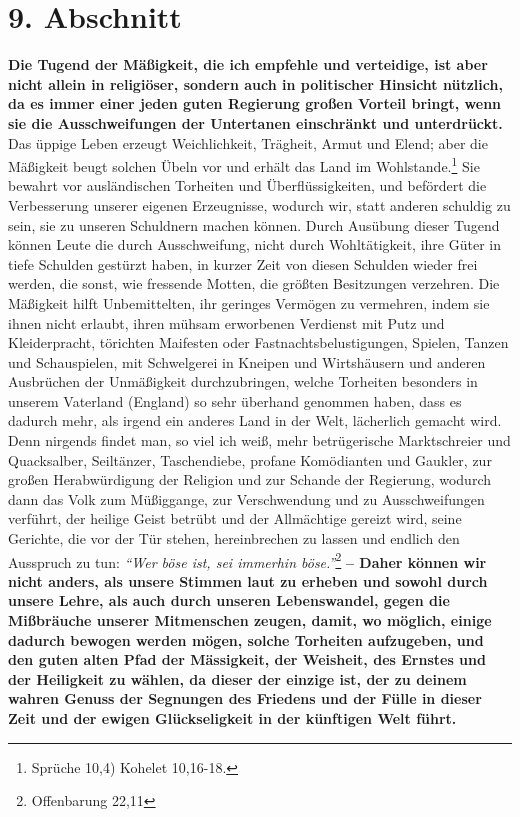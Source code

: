 \section{9. Abschnitt} \label{kap18_ab9}

\label{ref:18_09_gesellschaftlich} \textbf{Die Tugend der Mäßigkeit, die ich
empfehle und verteidige, ist aber nicht
allein in religiöser, sondern auch in politischer Hinsicht
nützlich, da es immer
einer jeden guten Regierung großen Vorteil bringt, wenn sie die
Ausschweifungen der Untertanen einschränkt und unterdrückt.} Das üppige Leben
erzeugt Weichlichkeit, Trägheit, Armut und Elend;
aber die Mäßigkeit beugt
solchen Übeln vor und erhält das Land im Wohlstande.\footnote{Sprüche 10,4)
Kohelet 10,16-18.}
Sie bewahrt vor ausländischen Torheiten und
Überflüssigkeiten, und befördert die Verbesserung unserer eigenen Erzeugnisse,
wodurch wir, statt anderen schuldig zu sein, sie zu unseren Schuldnern machen
können. Durch Ausübung dieser Tugend können Leute die durch Ausschweifung, nicht
durch Wohltätigkeit, ihre Güter in tiefe Schulden gestürzt haben, in kurzer
Zeit von diesen Schulden wieder frei werden, die sonst, wie fressende Motten,
die größten Besitzungen verzehren. Die Mäßigkeit hilft Unbemittelten, ihr
geringes Vermögen zu vermehren, indem sie ihnen nicht erlaubt, ihren mühsam
erworbenen Verdienst mit Putz und Kleiderpracht, törichten Maifesten oder
Fastnachtsbelustigungen, Spielen, Tanzen und Schauspielen, mit
Schwelgerei in
Kneipen und Wirtshäusern und anderen Ausbrüchen der
Unmäßigkeit durchzubringen,
welche Torheiten besonders in unserem Vaterland (England)
so sehr überhand
genommen haben, dass es dadurch mehr, als irgend ein anderes Land in der Welt,
lächerlich gemacht wird. Denn nirgends findet man, so viel ich weiß, mehr
betrügerische Marktschreier und Quacksalber,
Seiltänzer,
Taschendiebe, profane
Komödianten und Gaukler, zur großen Herabwürdigung der
Religion
und zur Schande
der Regierung, wodurch dann das Volk zum Müßiggange, zur
Verschwendung und zu
Ausschweifungen verführt, der heilige Geist betrübt und der Allmächtige gereizt
wird, seine Gerichte, die vor der Tür stehen, hereinbrechen zu lassen und
endlich den Ausspruch zu tun:
\textit{"`Wer böse ist, sei immerhin böse."'}\footnote{Offenbarung 22,11}
\label{ref:18_09_lautstark} \textbf{-- Daher
können wir nicht anders, als unsere
Stimmen laut zu erheben und sowohl durch unsere Lehre, als auch durch unseren
Lebenswandel, gegen die Mißbräuche unserer Mitmenschen zeugen, damit, wo
möglich, einige dadurch bewogen werden mögen, solche Torheiten aufzugeben,
und den guten alten Pfad der Mässigkeit, der Weisheit, des Ernstes und der
Heiligkeit zu wählen, da dieser der einzige ist, der zu deinem wahren Genuss
der Segnungen des Friedens und der Fülle in dieser Zeit und der ewigen
Glückseligkeit in der künftigen Welt führt.}

